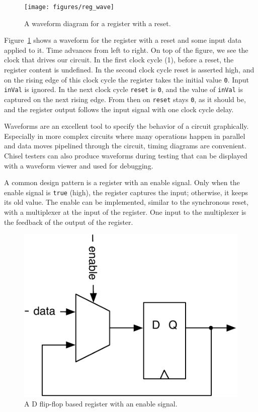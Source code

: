 \documentclass[%
    10pt,
    headinclude, footexclude,
    openright, %
    notitlepage,
    cleardoubleempty,
    headsepline,
    pointlessnumbers,
    bibtotoc, idxtotoc,
    ]{scrbook}
\newcommand{\code}[1]{{\small{\texttt{#1}}}}
\newcommand{\scale}{0.7}
\begin{document}

\begin{figure}
  \centering
  \texttt{[image: figures/reg\_wave]}
  \caption{A waveform diagram for a register with a reset.}
  \label{fig:register-wave}
\end{figure}

Figure~\ref{fig:register-wave} shows a waveform for the register with a reset
and some input data applied to it.
Time advances from left to right. On top of the figure, we see the clock that drives our circuit.
In the first clock cycle (1), before a reset, the register content is undefined.
In the second clock cycle reset is asserted high, and on the rising edge of this clock cycle the register
takes the initial value \code{0}. Input \code{inVal} is ignored. In the next clock cycle
\code{reset} is \code{0}, and the value of \code{inVal} is captured on the next rising
edge. From then on \code{reset} stays \code{0}, as it should be, and the
register output follows the input signal with one clock cycle delay.

Waveforms are an excellent tool to specify the behavior of a circuit graphically.
Especially in more complex circuits where many operations happen in parallel
and data moves pipelined through the circuit, timing diagrams are convenient.
Chisel testers can also produce waveforms during testing that can be displayed
with a waveform viewer and used for debugging.

A common design pattern is a register with an enable signal. Only when the enable signal
is \code{true} (high), the register captures the input; otherwise, it keeps its old value.
The enable can be implemented, similar to the synchronous reset, with
a multiplexer at the input of the register. One input to the multiplexer is the feedback of the
output of the register.

\begin{figure}
  \centering
  \includegraphics[scale=\scale]{figures/register-enable}
  \caption{A D flip-flop based register with an enable signal.}
  \label{fig:register-enable}
\end{figure}
\end{document}

